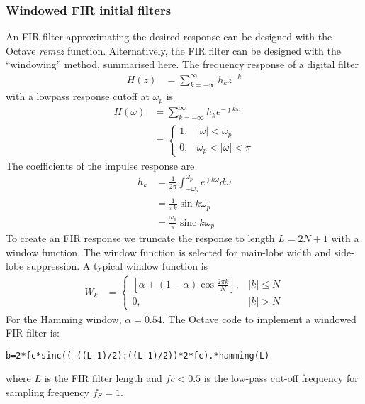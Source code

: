 \documentclass[a4paper,twoside,10pt,english]{report}
\DeclareMathOperator{\sinc}{sinc}
\begin{document}
\subsubsection{Windowed FIR initial filters}
An FIR filter approximating the desired response can be designed with the
Octave \emph{remez} function. Alternatively, the FIR filter can be designed with
the ``windowing'' method, summarised here. The frequency response of a digital
filter
\begin{align*}
H\left(z\right)&=\sum^{\infty}_{k=-\infty}h_{k}z^{-k}
\end{align*}
with a lowpass response cutoff at $\omega_{p}$ is
\begin{align*}
H\left(\omega\right)&=\sum^{\infty}_{k=-\infty}h_{k}e^{-\jmath k\omega}\\
&=\begin{cases}
1,&\left|\omega\right|<\omega_{p}\\
0,&\omega_{p}<\left|\omega\right|<\pi
\end{cases}
\end{align*}
The coefficients of the impulse response are
\begin{align*}
h_{k}&=\frac{1}{2\pi}\int_{-\omega_{p}}^{\omega_{p}}e^{\jmath k \omega}d\omega\\
&=\frac{1}{\pi k}\sin k\omega_{p}\\
&=\frac{\omega_{p}}{\pi}\sinc k\omega_{p}
\end{align*}
To create an FIR response we truncate the response to length $L=2N+1$ with a 
window function. The window function is selected for main-lobe width and 
side-lobe suppression. A typical window function is
\begin{align*}
W_{k}&=\begin{cases}
\left[\alpha+\left(1-\alpha\right)\cos \frac{2\pi k}{N}\right],
&\left|k\right|\le N\\
0,&\left|k\right|>N
\end{cases}
\end{align*}
For the Hamming window, $\alpha=0.54$. The Octave code to implement a windowed
FIR filter is:
\begin{small}
\begin{verbatim}
b=2*fc*sinc((-((L-1)/2):((L-1)/2))*2*fc).*hamming(L)
\end{verbatim}
\end{small}
where $L$ is the FIR filter length and $fc<0.5$ is the low-pass cut-off 
frequency for sampling frequency $f_{S}=1$.
\end{document}
